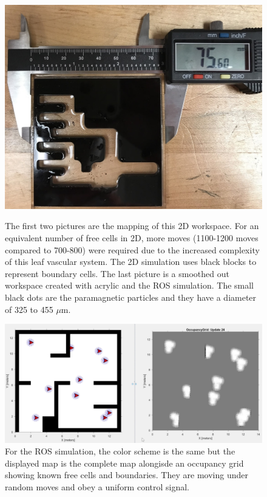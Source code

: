 \documentclass[letterpaper, 9 pt, conference]{ieeeconf}  %
\begin{document}
\begin{figure}
	\includegraphics[height=0.09\paperheight]{Optimized-Workspace-min.jpg}
	\caption{The first two pictures are the mapping of this 2D workspace. For an equivalent number of free cells in 2D, more moves (1100-1200 moves compared to 700-800) were required due to the increased complexity of this leaf vascular system. The 2D simulation uses black blocks to represent boundary cells. The last picture is a smoothed out workspace created with acrylic and the ROS simulation. The small black dots are the paramagnetic particles and they have a diameter of 325 to 455 $\mu$m. 
}
	\centering
	
	\includegraphics[height=0.12\paperheight]{Double_Workspace.jpg}
\caption{
For the ROS simulation, the color scheme is the same but the displayed map is the complete map alongisde an occupancy grid showing known free cells and boundaries. They are moving under random moves and obey a uniform control signal.
}
\end{figure}


\end{document}
